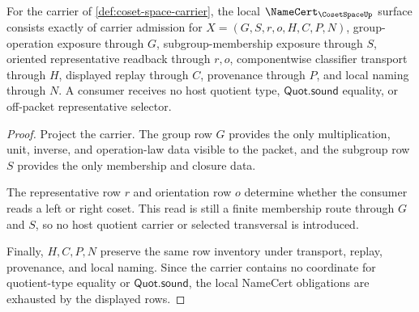 \begin{theorem}
\label{thm:coset-space-namecert-obligations}
For the carrier of \autoref{def:coset-space-carrier}, the local $\NameCert_{\CosetSpaceUp}$ surface consists exactly of carrier admission for $X=(G,S,r,o,H,C,P,N)$, group-operation exposure through $G$, subgroup-membership exposure through $S$, oriented representative readback through $r,o$, componentwise classifier transport through $H$, displayed replay through $C$, provenance through $P$, and local naming through $N$. A consumer receives no host quotient type, $\mathsf{Quot.sound}$ equality, or off-packet representative selector.
\end{theorem}
\begin{proof}
Project the carrier. The group row $G$ provides the only multiplication, unit, inverse, and operation-law data visible to the packet, and the subgroup row $S$ provides the only membership and closure data.

The representative row $r$ and orientation row $o$ determine whether the consumer reads a left or right coset. This read is still a finite membership route through $G$ and $S$, so no host quotient carrier or selected transversal is introduced.

Finally, $H,C,P,N$ preserve the same row inventory under transport, replay, provenance, and local naming. Since the carrier contains no coordinate for quotient-type equality or $\mathsf{Quot.sound}$, the local NameCert obligations are exhausted by the displayed rows.
\end{proof}

